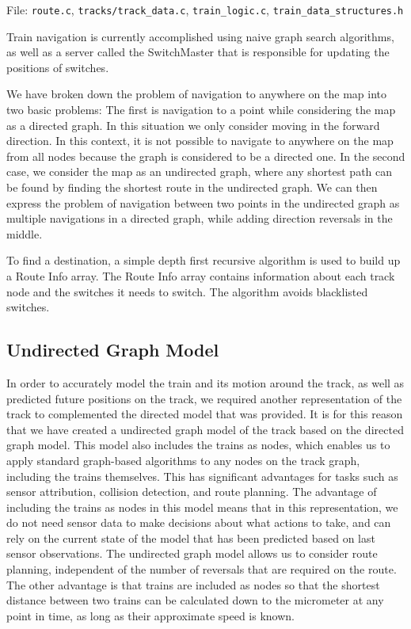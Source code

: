 \documentclass[letterpaper]{article}
\begin{document}
File: \texttt{route.c}, \texttt{tracks/track\_data.c}, \texttt{train\_logic.c}, \texttt{train\_data\_structures.h}

Train navigation is currently accomplished using naive graph search algorithms, as well as a server called the SwitchMaster that is responsible for updating the positions of switches.

We have broken down the problem of navigation to anywhere on the map into two basic problems: The first is navigation to a point while considering the map as a directed graph.  In this situation we only consider moving in the forward direction.  In this context, it is not possible to navigate to anywhere on the map from all nodes because the graph is considered to be a directed one.  In the second case, we consider the map as an undirected graph, where any shortest path can be found by finding the shortest route in the undirected graph.  We can then express the problem of navigation between two points in the undirected graph as multiple navigations in a directed graph, while adding direction reversals in the middle.

To find a destination, a simple depth first recursive algorithm is used to build up a Route Info array. The Route Info array contains information about each track node and the switches it needs to switch. The algorithm avoids blacklisted switches.


\subsection{Undirected Graph Model%
  \label{undirected-graph-model}%
}

In order to accurately model the train and its motion around the track, as well as predicted future positions on the track, we required another representation of the track to complemented the directed model that was provided.  It is for this reason that we have created a undirected graph model of the track based on the directed graph model.  This model also includes the trains as nodes, which enables us to apply standard graph-based algorithms to any nodes on the track graph, including the trains themselves.  This has significant advantages for tasks such as sensor attribution, collision detection, and route planning.  The advantage of including the trains as nodes in this model means that in this representation, we do not need sensor data to make decisions about what actions to take, and can rely on the current state of the model that has been predicted based on last sensor observations.  The undirected graph model allows us to consider route planning, independent of the number of reversals that are required on the route.  The other advantage is that trains are included as nodes so that the shortest distance between two trains can be calculated down to the micrometer at any point in time, as long as their approximate speed is known.
\end{document}
